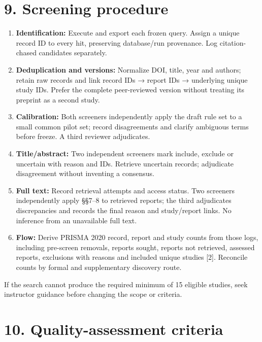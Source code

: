 \documentclass[
  12pt,
]{article}
\providecommand{\tightlist}{%
  \setlength{\itemsep}{0pt}\setlength{\parskip}{0pt}}
\begin{document}
\hypertarget{9-screening-procedure}{%
\section{9. Screening procedure}\label{9-screening-procedure}}

\begin{enumerate}
\def\labelenumi{\arabic{enumi}.}
\tightlist
\item
  \textbf{Identification:} Execute and export each frozen query. Assign
  a unique record ID to every hit, preserving database/run provenance.
  Log citation-chased candidates separately.
\item
  \textbf{Deduplication and versions:} Normalize DOI, title, year and
  authors; retain raw records and link record IDs → report IDs →
  underlying unique study IDs. Prefer the complete peer-reviewed version
  without treating its preprint as a second study.
\item
  \textbf{Calibration:} Both screeners independently apply the draft
  rule set to a small common pilot set; record disagreements and clarify
  ambiguous terms before freeze. A third reviewer adjudicates.
\item
  \textbf{Title/abstract:} Two independent screeners mark include,
  exclude or uncertain with reason and IDs. Retrieve uncertain records;
  adjudicate disagreement without inventing a consensus.
\item
  \textbf{Full text:} Record retrieval attempts and access status. Two
  screeners independently apply §§7--8 to retrieved reports; the third
  adjudicates discrepancies and records the final reason and
  study/report links. No inference from an unavailable full text.
\item
  \textbf{Flow:} Derive PRISMA 2020 record, report and study counts from
  those logs, including pre-screen removals, reports sought, reports not
  retrieved, assessed reports, exclusions with reasons and included
  unique studies {[}2{]}. Reconcile counts by formal and supplementary
  discovery route.
\end{enumerate}

If the search cannot produce the required minimum of 15 eligible
studies, seek instructor guidance before changing the scope or criteria.

\hypertarget{10-quality-assessment-criteria}{%
\section{10. Quality-assessment
criteria}\label{10-quality-assessment-criteria}}
\end{document}
